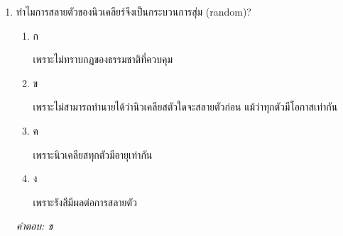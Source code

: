 \documentclass[12pt]{article}
\begin{document}
\begin{enumerate}[label=\arabic*., itemsep=0.5\baselineskip, topsep=0.5\baselineskip, leftmargin=*]
\item ทำไมการสลายตัวของนิวเคลียร์จึงเป็นกระบวนการสุ่ม (random)?
\begin{enumerate}[label=\alph*)., itemsep=0.3\baselineskip, topsep=0.3\baselineskip]
\item ก\ 
\begin{minipage}[t]{0.9\linewidth}
\raggedright เพราะไม่ทราบกฎของธรรมชาติที่ควบคุม
\end{minipage}
\item ข\ 
\begin{minipage}[t]{0.9\linewidth}
\raggedright เพราะไม่สามารถทำนายได้ว่านิวเคลียสตัวใดจะสลายตัวก่อน แม้ว่าทุกตัวมีโอกาสเท่ากัน
\end{minipage}
\item ค\ 
\begin{minipage}[t]{0.9\linewidth}
\raggedright เพราะนิวเคลียสทุกตัวมีอายุเท่ากัน
\end{minipage}
\item ง\ 
\begin{minipage}[t]{0.9\linewidth}
\raggedright เพราะรังสีมีผลต่อการสลายตัว
\end{minipage}
\end{enumerate}
\vspace{-0.3\baselineskip}
\begin{small}
\textit{คำตอบ: ข}
\end{small}

\end{enumerate}
\end{document}
